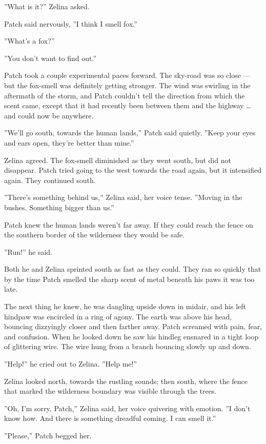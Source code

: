 \documentclass[12pt]{book}
\begin{document}
''What is it?'' Zelina asked.

Patch said nervously, ''I think I smell fox.''

''What's a fox?''

''You don't want to find out.''

Patch took a couple experimental paces forward. The sky-road was so
close --- but the fox-smell was definitely getting stronger. The wind
was swirling in the aftermath of the storm, and Patch couldn't tell
the direction from which the scent came, except that it had recently
been between them and the highway \ldots{} and could now be anywhere.

''We'll go south, towards the human lands,'' Patch said
quietly. ''Keep your eyes and ears open, they're better than mine.''

Zelina agreed. The fox-smell diminished as they went south, but did
not disappear. Patch tried going to the west towards the road again,
but it intensified again. They continued south.

''There's something behind us,'' Zelina said, her voice
tense. ''Moving in the bushes. Something bigger than us.''

Patch knew the human lands weren't far away. If they could reach the
fence on the southern border of the wilderness they would be safe.

''Run!'' he said.

Both he and Zelina sprinted south as fast as they could. They ran so
quickly that by the time Patch smelled the sharp scent of metal
beneath his paws it was too late.

The next thing he knew, he was dangling upside down in midair, and his
left hindpaw was encircled in a ring of agony. The earth was above his
head, bouncing dizzyingly closer and then farther away. Patch screamed
with pain, fear, and confusion. When he looked down he saw his hindleg
ensnared in a tight loop of glittering wire. The wire hung from a
branch bouncing slowly up and down.

''Help!'' he cried out to Zelina. ''Help me!''

Zelina looked north, towards the rustling sounds; then south, where
the fence that marked the wilderness boundary was visible through the
trees.

''Oh, I'm sorry, Patch,'' Zelina said, her voice quivering with
emotion. ''I don't know how. And there is something dreadful coming. I
can smell it.''

''Please,'' Patch begged her.
\end{document}
